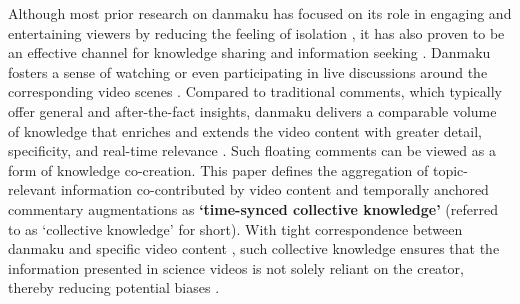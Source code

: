 Although most prior research on danmaku has focused on its role in engaging and entertaining viewers by reducing the feeling of isolation \cite{liao2023research,chen2015understanding,lin2018exploratory}, it has also proven to be an effective channel for knowledge sharing and information seeking \cite{he2021beyond, li2022classification, ma2017video, huang2020good, chen2017watching}. 
Danmaku fosters a sense of watching or even participating in live discussions around the corresponding video scenes \cite{chen2015understanding,ma2014analysis, huang2024sharing}. 
Compared to traditional comments, which typically offer general and after-the-fact insights, danmaku delivers a comparable volume of knowledge that enriches and extends the video content with greater detail, specificity, and real-time relevance \cite{he2021beyond, wu2018danmaku, wu2019danmaku, chen2017watching}.
Such floating comments can be viewed as a form of knowledge co-creation. This paper defines the aggregation of
topic-relevant information co-contributed by video content and temporally anchored commentary augmentations as \textbf{`time-synced collective knowledge'} (referred to as `collective knowledge' for short). With tight correspondence between danmaku and specific video content \cite{he2021beyond}, such collective knowledge ensures that the information presented in science videos is not solely reliant on the creator, thereby reducing potential biases \cite{he2021beyond,yao2017understanding}.


